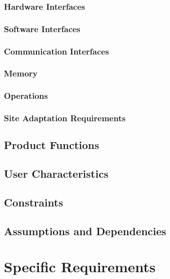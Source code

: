 \documentclass[10pt,a4paper]{article}
\begin{document}
			\subsubsection{Hardware Interfaces}
			
			\subsubsection{Software Interfaces}
			
			\subsubsection{Communication Interfaces}
			
			\subsubsection{Memory}
			
			\subsubsection{Operations}
			
			\subsubsection{Site Adaptation Requirements}
		
		\subsection{Product Functions}
		
		\subsection{User Characteristics}
		
		\subsection{Constraints}
		
		\subsection{Assumptions and Dependencies}
	
	\section{Specific Requirements}
	
\end{document}
